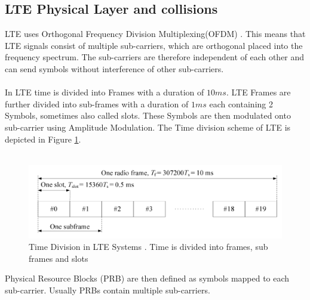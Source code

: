 \documentclass[conference]{IEEEtran}
\begin{document}
\subsection{LTE Physical Layer and collisions} \label{collision}
LTE uses Orthogonal Frequency Division Multiplexing(OFDM) \cite{ETSI_TS_138_211}.
This means that LTE signals consist of multiple sub-carriers, which are orthogonal placed into the frequency spectrum.
The sub-carriers are therefore independent of each other and can send symbols without interference of other sub-carriers.\\\\
In LTE time is divided into Frames with a duration of $10 ms$.
LTE Frames are further divided into sub-frames with a duration of $1 ms$ each containing 2 Symbols, sometimes also called slots. These Symbols are then modulated onto sub-carrier using Amplitude Modulation. The Time division scheme of LTE is depicted in Figure \ref{fig:time}.\\\\
\begin{figure}
    \centering
    \includegraphics[width= \columnwidth]{../Figures/LTE_Frame2.png}
    \caption{Time Division in LTE Systems \cite{ETSI_TS_138_211}. Time is divided into frames, sub frames and slots}
    \label{fig:time}
\end{figure}
Physical Resource Blocks (PRB) are then defined as symbols mapped to each sub-carrier. Usually PRBs contain multiple sub-carriers.
\end{document}
